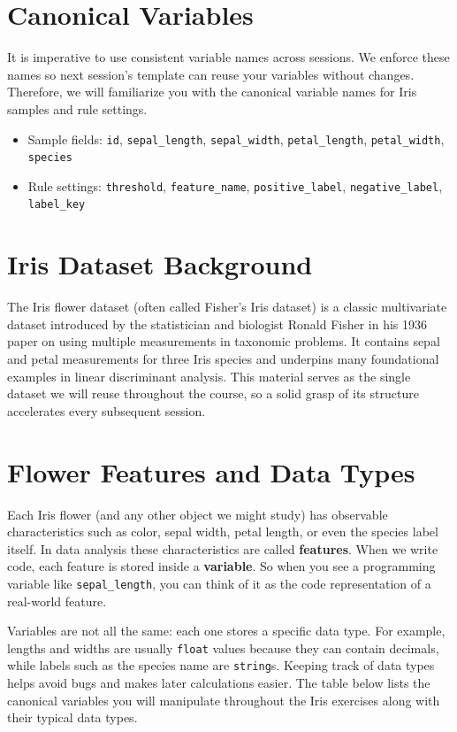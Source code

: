 \section{Canonical Variables}

It is imperative to use consistent variable names across sessions. We enforce these names so next session's template can reuse your variables without changes. Therefore, we will familiarize you with the canonical variable names for Iris samples and rule settings.

\begin{itemize}
    \item Sample fields: \texttt{id}, \texttt{sepal\_length}, \texttt{sepal\_width}, \texttt{petal\_length}, \texttt{petal\_width}, \texttt{species}
    \item Rule settings: \texttt{threshold}, \texttt{feature\_name}, \texttt{positive\_label}, \texttt{negative\_label}, \texttt{label\_key}
\end{itemize}

\section{Iris Dataset Background}

The Iris flower dataset (often called Fisher's Iris dataset) is a classic multivariate dataset introduced by the statistician and biologist Ronald Fisher in his 1936 paper on using multiple measurements in taxonomic problems. It contains sepal and petal measurements for three Iris species and underpins many foundational examples in linear discriminant analysis. This material serves as the single dataset we will reuse throughout the course, so a solid grasp of its structure accelerates every subsequent session.

\section{Flower Features and Data Types}

Each Iris flower (and any other object we might study) has observable characteristics such as color, sepal width, petal length, or even the species label itself. In data analysis these characteristics are called \textbf{features}. When we write code, each feature is stored inside a \textbf{variable}. So when you see a programming variable like \texttt{sepal\_length}, you can think of it as the code representation of a real-world feature.

Variables are not all the same: each one stores a specific data type. For example, lengths and widths are usually \texttt{float} values because they can contain decimals, while labels such as the species name are \texttt{string}s. Keeping track of data types helps avoid bugs and makes later calculations easier. The table below lists the canonical variables you will manipulate throughout the Iris exercises along with their typical data types.

